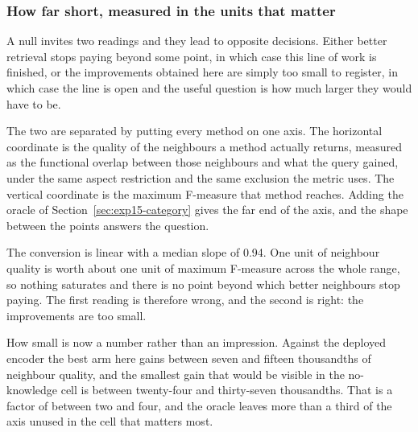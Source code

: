 \subsubsection{How far short, measured in the units that matter}
\label{sec:exp15-conversion}

A null invites two readings and they lead to opposite decisions. Either better
retrieval stops paying beyond some point, in which case this line of work is finished,
or the improvements obtained here are simply too small to register, in which case the
line is open and the useful question is how much larger they would have to be.

The two are separated by putting every method on one axis. The horizontal coordinate
is the quality of the neighbours a method actually returns, measured as the functional
overlap between those neighbours and what the query gained, under the same aspect
restriction and the same exclusion the metric uses. The vertical coordinate is the
maximum F-measure that method reaches. Adding the oracle of
Section~\ref{sec:exp15-category} gives the far end of the axis, and the shape between
the points answers the question.

\begin{table}[htbp]
  \centering
  \caption{The conversion from neighbour quality into maximum F-measure. Slope is
  measured between the deployed encoder and the oracle. \emph{Best gain} is the
  largest improvement in neighbour quality any encoder here achieves over the deployed
  one; \emph{needed} is the improvement at which the difference would reach half the
  width of that cell's confidence interval.}
  \label{tab:exp15-conversion}
  
\end{table}

The conversion is linear with a median slope of 0.94. One unit of neighbour quality is
worth about one unit of maximum F-measure across the whole range, so nothing saturates
and there is no point beyond which better neighbours stop paying. The first reading is
therefore wrong, and the second is right: the improvements are too small.

How small is now a number rather than an impression. Against the deployed encoder the
best arm here gains between seven and fifteen thousandths of neighbour quality, and
the smallest gain that would be visible in the no-knowledge cell is between
twenty-four and thirty-seven thousandths. That is a factor of between two and four,
and the oracle leaves more than a third of the axis unused in the cell that matters
most.

